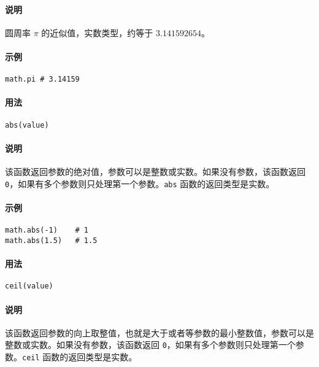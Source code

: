 \paragraph{说明}
圆周率 $\pi$ 的近似值，实数类型，约等于 $3.141592654$。

\paragraph{示例}
\begin{lstlisting}[language=berry, numbers=none]
math.pi # 3.14159
\end{lstlisting}


\paragraph{用法}
\begin{lstlisting}[language=berry, numbers=none]
abs(value)
\end{lstlisting}

\paragraph{说明}
该函数返回参数的绝对值，参数可以是整数或实数。如果没有参数，该函数返回 \texttt{0}，如果有多个参数则只处理第一个参数。\texttt{abs} 函数的返回类型是实数。

\paragraph{示例}
\begin{lstlisting}[language=berry, numbers=none]
math.abs(-1)    # 1
math.abs(1.5)   # 1.5
\end{lstlisting}


\paragraph{用法}
\begin{lstlisting}[language=berry, numbers=none]
ceil(value)
\end{lstlisting}

\paragraph{说明}
该函数返回参数的向上取整值，也就是大于或者等参数的最小整数值，参数可以是整数或实数。如果没有参数，该函数返回 \texttt{0}，如果有多个参数则只处理第一个参数。\texttt{ceil} 函数的返回类型是实数。

